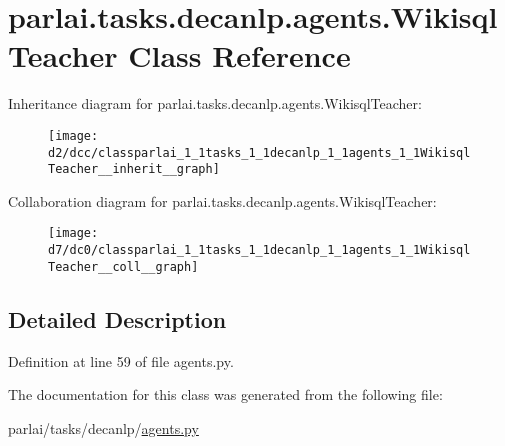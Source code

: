 \hypertarget{classparlai_1_1tasks_1_1decanlp_1_1agents_1_1WikisqlTeacher}{}\section{parlai.\+tasks.\+decanlp.\+agents.\+Wikisql\+Teacher Class Reference}
\label{classparlai_1_1tasks_1_1decanlp_1_1agents_1_1WikisqlTeacher}


Inheritance diagram for parlai.\+tasks.\+decanlp.\+agents.\+Wikisql\+Teacher\+:
\nopagebreak
\begin{figure}[H]
\begin{center}
\leavevmode
\texttt{[image: d2/dcc/classparlai\_1\_1tasks\_1\_1decanlp\_1\_1agents\_1\_1WikisqlTeacher\_\_inherit\_\_graph]}
\end{center}
\end{figure}


Collaboration diagram for parlai.\+tasks.\+decanlp.\+agents.\+Wikisql\+Teacher\+:
\nopagebreak
\begin{figure}[H]
\begin{center}
\leavevmode
\texttt{[image: d7/dc0/classparlai\_1\_1tasks\_1\_1decanlp\_1\_1agents\_1\_1WikisqlTeacher\_\_coll\_\_graph]}
\end{center}
\end{figure}


\subsection{Detailed Description}


Definition at line 59 of file agents.\+py.



The documentation for this class was generated from the following file\+:\begin{DoxyCompactItemize}
\item 
parlai/tasks/decanlp/\hyperlink{parlai_2tasks_2decanlp_2agents_8py}{agents.\+py}\end{DoxyCompactItemize}
